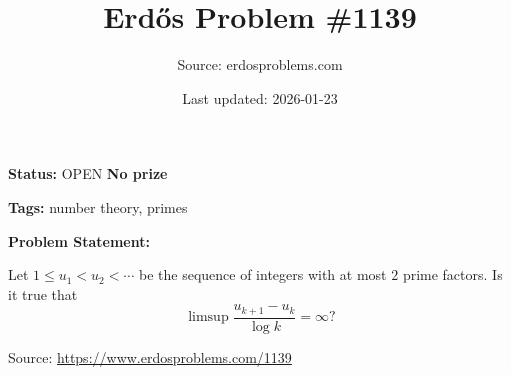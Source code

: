 \documentclass{article}
\title{Erd\H{o}s Problem \#1139}
\date{Last updated: 2026-01-23}
\author{Source: erdosproblems.com}
\begin{document}
\maketitle

\noindent\textbf{Status:} OPEN \quad \textbf{No prize}

\noindent\textbf{Tags:} number theory, primes

\medskip
\noindent\textbf{Problem Statement:}

Let $1\leq u_1<u_2<\cdots$ be the sequence of integers with at most $2$ prime factors. Is it true that\[\limsup \frac{u_{k+1}-u_k}{\log k}=\infty?\]

\bigskip
\noindent\small{Source: \url{https://www.erdosproblems.com/1139}}
\end{document}
